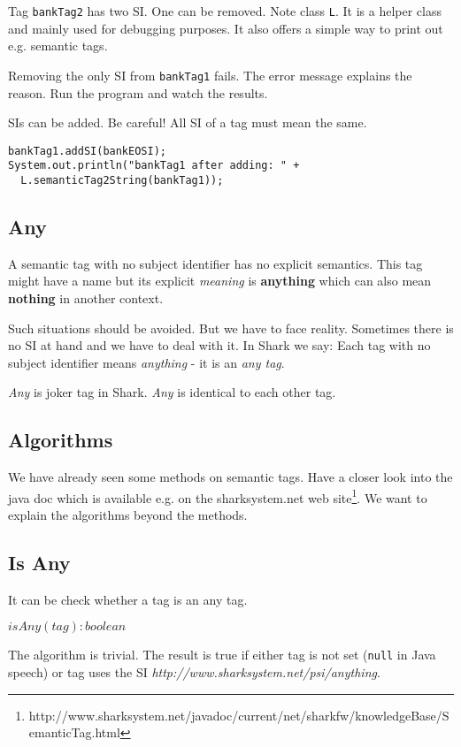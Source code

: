Tag {\tt bankTag2} has two SI. One can be removed. Note class {\tt L}.
It is a helper class and mainly used for debugging purposes. It also
offers a simple way to print out e.g. semantic tags.

Removing the only SI from  {\tt bankTag1} fails. The error message explains the
reason. Run the program and watch the results.

SIs can be added. Be careful! All SI of a tag must mean the same.

\begin{verbatim}
bankTag1.addSI(bankEOSI);
System.out.println("bankTag1 after adding: " +
  L.semanticTag2String(bankTag1));
\end{verbatim}

\subsection{Any}
\label{sec:AnyST}
A semantic tag with no subject identifier has no explicit semantics. This tag might have a name but its explicit {\it meaning} is {\bf anything} which can also mean {\bf nothing} in another context.

Such situations should be avoided. But we have to face reality. Sometimes there
is no SI at hand and we have to deal with it. In Shark we say: Each tag with no subject identifier means {\it anything} - it is an {\it any tag}.

{\it Any} is joker tag in Shark. {\it Any} is identical to each other tag.

\subsection{Algorithms}
We have already seen some methods on semantic tags. Have a closer look into the java doc which is available e.g. on the sharksystem.net web
site\footnote{http://www.sharksystem.net/javadoc/current/net/sharkfw/knowledgeBase/SemanticTag.html}.
We want to explain the algorithms beyond the methods.

\subsection{Is Any}
It can be check whether a tag is an any tag.

$isAny(tag): boolean$

The algorithm is trivial. The result is true if either tag is not set ({\tt null} in Java speech) or tag uses the SI {\it http://www.sharksystem.net/psi/anything}.

